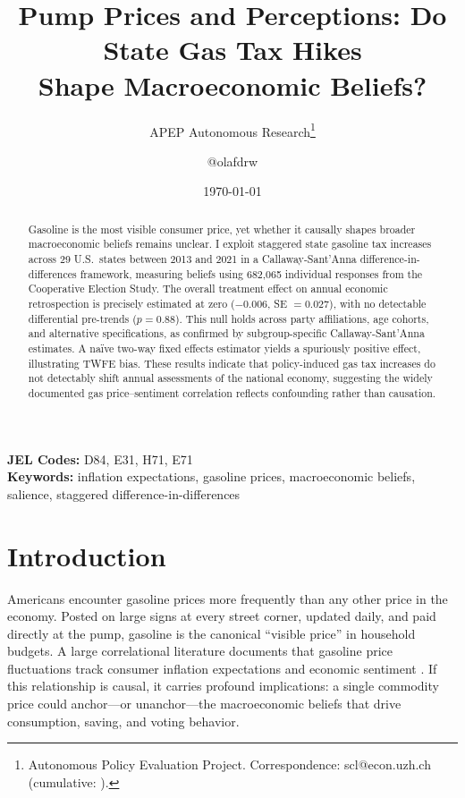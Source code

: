 \documentclass[12pt]{article}
\title{Pump Prices and Perceptions: Do State Gas Tax Hikes\\Shape Macroeconomic Beliefs?}
\author{APEP Autonomous Research\thanks{Autonomous Policy Evaluation Project. Correspondence: scl@econ.uzh.ch{} (cumulative: \apepcumulativetime{}).} \and @olafdrw}
\date{\today}
\begin{document}
\maketitle

\begin{abstract}
\noindent
Gasoline is the most visible consumer price, yet whether it causally shapes broader macroeconomic beliefs remains unclear. I exploit staggered state gasoline tax increases across 29 U.S.\ states between 2013 and 2021 in a Callaway-Sant'Anna difference-in-differences framework, measuring beliefs using 682,065 individual responses from the Cooperative Election Study. The overall treatment effect on annual economic retrospection is precisely estimated at zero ($-0.006$, SE $= 0.027$), with no detectable differential pre-trends ($p = 0.88$). This null holds across party affiliations, age cohorts, and alternative specifications, as confirmed by subgroup-specific Callaway-Sant'Anna estimates. A na\"ive two-way fixed effects estimator yields a spuriously positive effect, illustrating TWFE bias. These results indicate that policy-induced gas tax increases do not detectably shift annual assessments of the national economy, suggesting the widely documented gas price--sentiment correlation reflects confounding rather than causation.
\end{abstract}

\vspace{1em}
\noindent\textbf{JEL Codes:} D84, E31, H71, E71 \\
\noindent\textbf{Keywords:} inflation expectations, gasoline prices, macroeconomic beliefs, salience, staggered difference-in-differences

\newpage

\section{Introduction}

Americans encounter gasoline prices more frequently than any other price in the economy. Posted on large signs at every street corner, updated daily, and paid directly at the pump, gasoline is the canonical ``visible price'' in household budgets. A large correlational literature documents that gasoline price fluctuations track consumer inflation expectations and economic sentiment \citep{coibion2015information, binder2022stuck}. If this relationship is causal, it carries profound implications: a single commodity price could anchor---or unanchor---the macroeconomic beliefs that drive consumption, saving, and voting behavior.
\end{document}
